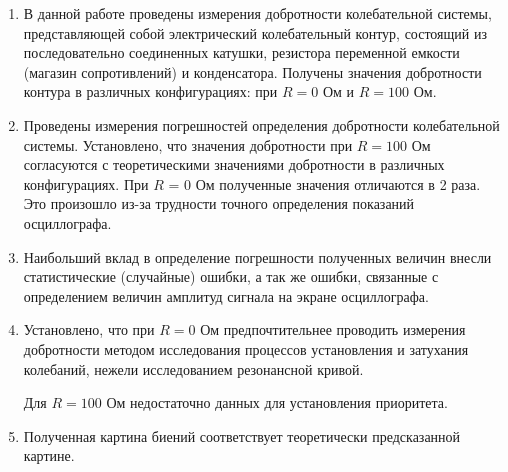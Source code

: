 \documentclass[10pt,a4paper]{article}
\begin{document}
	\begin{enumerate}
		\item В данной работе проведены измерения добротности колебательной системы, представляющей собой электрический колебательный контур, состоящий из последовательно соединенных катушки, резистора переменной емкости (магазин сопротивлений) и конденсатора. Получены значения добротности контура в различных конфигурациях: при $R = 0$ Ом и $R = 100$ Ом.
		\item Проведены измерения погрешностей определения добротности колебательной системы. Установлено, что значения добротности при $R = 100$ Ом согласуются с теоретическими значениями добротности в различных конфигурациях. При $R$ = 0 $Ом$ полученные значения отличаются в 2 раза. Это произошло из-за трудности точного определения показаний осциллографа.
		\item Наибольший вклад в определение погрешности полученных величин внесли статистические (случайные) ошибки, а так же ошибки, связанные с определением величин амплитуд сигнала на экране осциллографа.
		\item Установлено, что при $R = 0$ Ом предпочтительнее проводить измерения добротности методом исследования процессов установления и затухания колебаний, нежели исследованием резонансной кривой. 
		
		Для $R = 100$ Ом недостаточно данных для установления приоритета.
		\item Полученная картина биений соответствует теоретически предсказанной картине.
	\end{enumerate}


	
\end{document}
